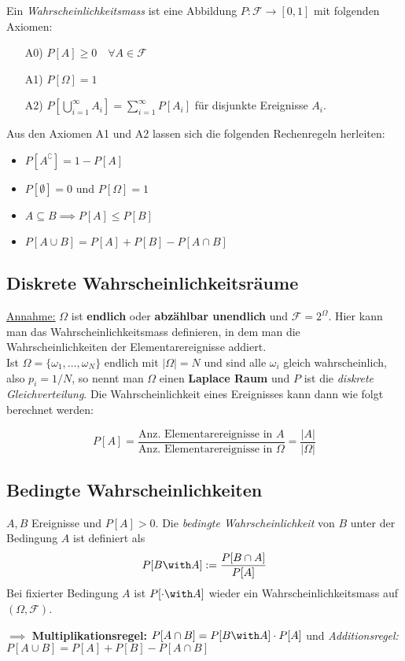 \begin{definition}
Ein \textit{Wahrscheinlichkeitsmass} ist eine Abbildung $P: \mathcal{F}\to [0,1]$ mit folgenden Axiomen:
\begin{itemize}
\item[A0)] $P[A] \geq 0 \quad \forall A\in \mathcal{F}$
\item[A1)] $P[\Omega] = 1$
\item[A2)] $P\left[\bigcup_{i=1}^\infty A_i\right] = \sum_{i=1}^\infty P[A_i]$ für disjunkte Ereignisse $A_i$.
\end{itemize}
\end{definition}
Aus den Axiomen A1 und A2 lassen sich die folgenden Rechenregeln herleiten:
\begin{itemize}
\item $P[A^\complement] = 1 - P[A]$
\item $P[\emptyset] = 0$ und $P[\Omega] = 1$
\item $A \subseteq B \implies P[A] \leq P[B]$
\item $P[A \cup B] = P[A] + P[B] - P[A\cap B]$
\end{itemize}

\subsection{Diskrete Wahrscheinlichkeitsräume}
\underline{Annahme:} $\Omega$ ist \textbf{endlich} oder \textbf{abzählbar unendlich} und $\mathcal{F}=2^\Omega$. Hier kann man das Wahrscheinlichkeitsmass definieren, in dem man die Wahrscheinlichkeiten der Elementarereignisse addiert.\\

Ist $\Omega = \{\omega_1, \dots, \omega_N\}$ endlich mit $|\Omega| = N$ und sind alle $\omega_i$ gleich wahrscheinlich, also $p_i = 1/N$, so nennt man $\Omega$ einen \textbf{Laplace Raum} und $P$ ist die \textit{diskrete Gleichverteilung}. Die Wahrscheinlichkeit eines Ereignisses kann dann wie folgt berechnet werden:

$$ P[A] = \frac{\mbox{Anz. Elementarereignisse in } A}{\mbox{Anz. Elementarereignisse in } \Omega} = \frac{|A|}{|\Omega|}$$

\subsection{Bedingte Wahrscheinlichkeiten}
\begin{definition}
$A,B$ Ereignisse und $P[A] > 0$. Die \textit{bedingte Wahrscheinlichkeit} von $B$ unter der Bedingung $A$ ist definiert als
$$ P[B \with A] := \frac{P[B \cap A ]}{P[A]}$$
Bei fixierter Bedingung $A$ ist $P[\cdot \with A]$ wieder ein Wahrscheinlichkeitsmass auf $(\Omega, \mathcal{F})$.
\end{definition}
$\implies$ \textbf{Multiplikationsregel:} $P[A\cap B] = P[B \with A] \cdot P[A]$ und \textit{Additionsregel:} $P[A\cup B] = P[A] + P[B] - P[A\cap B]$

